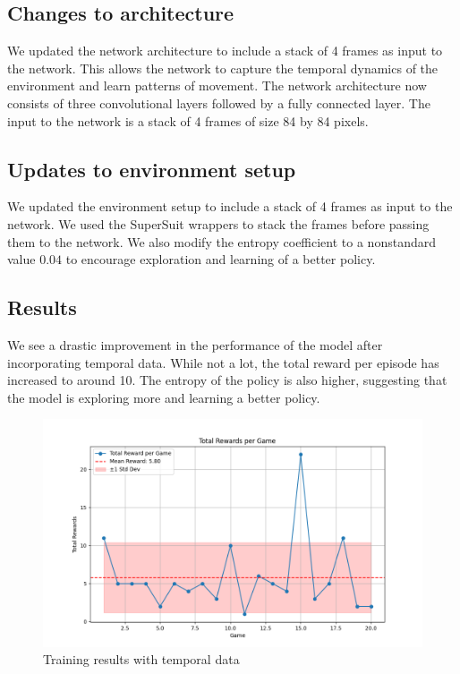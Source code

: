\documentclass{article}
\begin{document}
\subsection{Changes to architecture}
We updated the network architecture to include a stack of 4 frames as input to the network. This allows the network to capture the temporal dynamics of the environment
and learn patterns of movement. The network architecture now consists of three convolutional layers followed by a fully connected layer. The input to the network is a stack of 4 frames
of size 84 by 84 pixels.

\subsection{Updates to environment setup}
We updated the environment setup to include a stack of 4 frames as input to the network. We used the SuperSuit wrappers to stack the frames before passing them to the network. We also modify
the entropy coefficient to a nonstandard value $0.04$ to encourage exploration and learning of a better policy.

\subsection{Results}
We see a drastic improvement in the performance of the model after incorporating temporal data. 
While not a lot, the total reward per episode has increased to around 10. The entropy of the policy is also higher, suggesting that the model is exploring more and learning a better policy.

\begin{figure}[h]
  \centering
  \includegraphics[scale=0.6]{rewards2.png}
  \caption{Training results with temporal data}
  \label{fig:training_results_with_temporal}
\end{figure}
\end{document}
